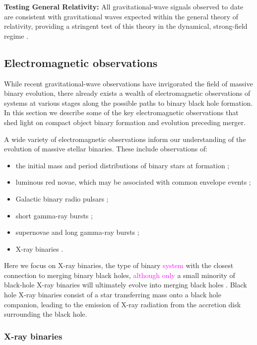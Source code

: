 \documentclass[iop,onecolumn]{revtex4}
\newcommand{\ilya}[1]{\textcolor{magenta}{#1}}
\begin{document}
\textbf{Testing General Relativity:} All gravitational-wave signals observed to date are consistent with gravitational waves expected within the general theory of relativity, providing a stringent test of this theory in the dynamical, strong-field regime \citep{GW150914:GR,GW170104}.

\subsection{Electromagnetic observations}

While recent gravitational-wave observations have invigorated the field of massive binary evolution, there already exists a wealth of electromagnetic observations of systems at various stages along the possible paths to binary black hole formation. In this section we describe some of the key electromagnetic observations that shed light on compact object binary formation and evolution preceding merger.

A wide variety of electromagnetic observations inform our understanding of the evolution of massive stellar binaries. These include observations of: 
\begin{itemize}
\item the initial mass and period distributions of binary stars at formation \ilya{\citep[e.g.,][]{Sana:2012,MoeDiStefano:2017}}; 
\item luminous red novae, which may be associated with common envelope events \citep[e.g.,][]{Ivanova:2013LRN};
\item Galactic binary radio pulsars \citep[e.g.,][]{Tauris:2017};
\item short gamma-ray bursts \citep[e.g.,][]{Berger:2014};
\item supernovae and long gamma-ray bursts \ilya{\citep[e.g.,][]{Cantiello:2007,Szecsi:2017}};
\item X-ray binaries \ilya{\citep[e.g.,][]{TaurisvdH:2006}}.
\end{itemize}
Here we focus on X-ray binaries, the type of binary \ilya{system} with the closest connection to merging binary black holes, \ilya{although only} a small minority of black-hole X-ray binaries will ultimately evolve into merging black holes \citep{CygnusX3:2012}. Black hole X-ray binaries consist of a star transferring mass onto a black hole companion, leading to the emission of X-ray radiation from the accretion disk surrounding the black hole. 

\subsubsection{X-ray binaries}
\end{document}
